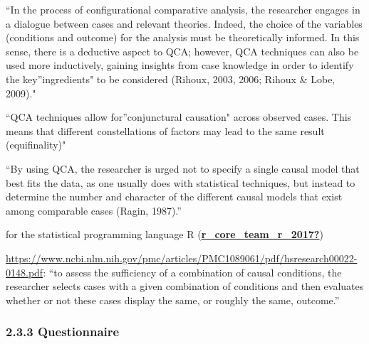 \documentclass[
]{article}
\begin{document}
``In the process of configurational comparative analysis, the researcher
engages in a dialogue between cases and relevant theories. Indeed, the
choice of the variables (conditions and outcome) for the analysis must
be theoretically informed. In this sense, there is a deductive aspect to
QCA; however, QCA techniques can also be used more inductively, gaining
insights from case knowledge in order to identify the key''ingredients"
to be considered (Rihoux, 2003, 2006; Rihoux \& Lobe, 2009)."

``QCA techniques allow for''conjunctural causation" across observed
cases. This means that different constellations of factors may lead to
the same result (equifinality)"

``By using QCA, the researcher is urged not to specify a single causal
model that best fits the data, as one usually does with statistical
techniques, but instead to determine the number and character of the
different causal models that exist among comparable cases (Ragin,
1987).''

for the statistical programming language R
(\protect\hyperlink{ref-r_core_team_r_2017}{\textbf{r\_core\_team\_r\_2017?}})

\url{https://www.ncbi.nlm.nih.gov/pmc/articles/PMC1089061/pdf/hsresearch00022-0148.pdf}:
``to assess the sufficiency of a combination of causal conditions, the
researcher selects cases with a given combination of conditions and then
evaluates whether or not these cases display the same, or roughly the
same, outcome.''

\hypertarget{questionnaire}{%
\subsubsection{2.3.3 Questionnaire}\label{questionnaire}}
\end{document}
